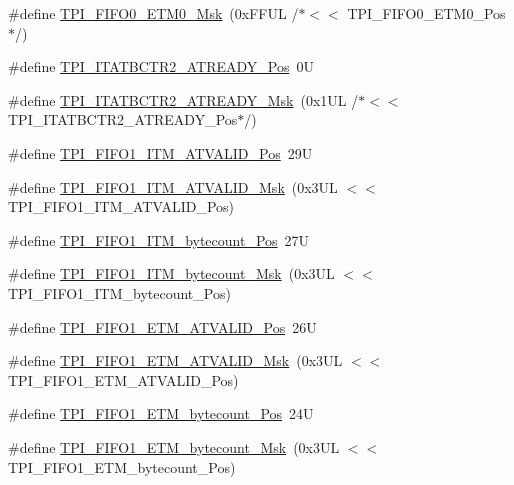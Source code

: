 \begin{DoxyCompactItemize}
\#define \hyperlink{group___c_m_s_i_s___t_p_i_gaf924f7d1662f3f6c1da12052390cb118}{T\+P\+I\+\_\+\+F\+I\+F\+O0\+\_\+\+E\+T\+M0\+\_\+\+Msk}~(0x\+F\+F\+U\+L /$\ast$$<$$<$ T\+P\+I\+\_\+\+F\+I\+F\+O0\+\_\+\+E\+T\+M0\+\_\+\+Pos$\ast$/)
\item 
\#define \hyperlink{group___c_m_s_i_s___t_p_i_ga6959f73d7db4a87ae9ad9cfc99844526}{T\+P\+I\+\_\+\+I\+T\+A\+T\+B\+C\+T\+R2\+\_\+\+A\+T\+R\+E\+A\+D\+Y\+\_\+\+Pos}~0U
\item 
\#define \hyperlink{group___c_m_s_i_s___t_p_i_ga1859502749709a2e5ead9a2599d998db}{T\+P\+I\+\_\+\+I\+T\+A\+T\+B\+C\+T\+R2\+\_\+\+A\+T\+R\+E\+A\+D\+Y\+\_\+\+Msk}~(0x1\+U\+L /$\ast$$<$$<$ T\+P\+I\+\_\+\+I\+T\+A\+T\+B\+C\+T\+R2\+\_\+\+A\+T\+R\+E\+A\+D\+Y\+\_\+\+Pos$\ast$/)
\item 
\#define \hyperlink{group___c_m_s_i_s___t_p_i_ga08edfc862b2c8c415854cc4ae2067dfb}{T\+P\+I\+\_\+\+F\+I\+F\+O1\+\_\+\+I\+T\+M\+\_\+\+A\+T\+V\+A\+L\+I\+D\+\_\+\+Pos}~29U
\item 
\#define \hyperlink{group___c_m_s_i_s___t_p_i_gabc1f6a3b6cac0099d7c01ca949b4dd08}{T\+P\+I\+\_\+\+F\+I\+F\+O1\+\_\+\+I\+T\+M\+\_\+\+A\+T\+V\+A\+L\+I\+D\+\_\+\+Msk}~(0x3\+U\+L $<$$<$ T\+P\+I\+\_\+\+F\+I\+F\+O1\+\_\+\+I\+T\+M\+\_\+\+A\+T\+V\+A\+L\+I\+D\+\_\+\+Pos)
\item 
\#define \hyperlink{group___c_m_s_i_s___t_p_i_gaa22ebf7c86e4f4b2c98cfd0b5981375a}{T\+P\+I\+\_\+\+F\+I\+F\+O1\+\_\+\+I\+T\+M\+\_\+bytecount\+\_\+\+Pos}~27U
\item 
\#define \hyperlink{group___c_m_s_i_s___t_p_i_gacba2edfc0499828019550141356b0dcb}{T\+P\+I\+\_\+\+F\+I\+F\+O1\+\_\+\+I\+T\+M\+\_\+bytecount\+\_\+\+Msk}~(0x3\+U\+L $<$$<$ T\+P\+I\+\_\+\+F\+I\+F\+O1\+\_\+\+I\+T\+M\+\_\+bytecount\+\_\+\+Pos)
\item 
\#define \hyperlink{group___c_m_s_i_s___t_p_i_ga3177b8d815cf4a707a2d3d3d5499315d}{T\+P\+I\+\_\+\+F\+I\+F\+O1\+\_\+\+E\+T\+M\+\_\+\+A\+T\+V\+A\+L\+I\+D\+\_\+\+Pos}~26U
\item 
\#define \hyperlink{group___c_m_s_i_s___t_p_i_ga0e8f29a1e9378d1ceb0708035edbb86d}{T\+P\+I\+\_\+\+F\+I\+F\+O1\+\_\+\+E\+T\+M\+\_\+\+A\+T\+V\+A\+L\+I\+D\+\_\+\+Msk}~(0x3\+U\+L $<$$<$ T\+P\+I\+\_\+\+F\+I\+F\+O1\+\_\+\+E\+T\+M\+\_\+\+A\+T\+V\+A\+L\+I\+D\+\_\+\+Pos)
\item 
\#define \hyperlink{group___c_m_s_i_s___t_p_i_gaab31238152b5691af633a7475eaf1f06}{T\+P\+I\+\_\+\+F\+I\+F\+O1\+\_\+\+E\+T\+M\+\_\+bytecount\+\_\+\+Pos}~24U
\item 
\#define \hyperlink{group___c_m_s_i_s___t_p_i_gab554305459953b80554fdb1908b73291}{T\+P\+I\+\_\+\+F\+I\+F\+O1\+\_\+\+E\+T\+M\+\_\+bytecount\+\_\+\+Msk}~(0x3\+U\+L $<$$<$ T\+P\+I\+\_\+\+F\+I\+F\+O1\+\_\+\+E\+T\+M\+\_\+bytecount\+\_\+\+Pos)

\end{DoxyCompactItemize}
